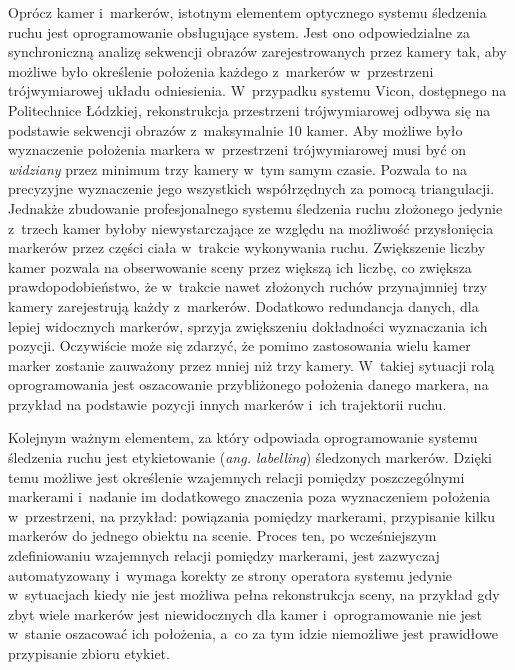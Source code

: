 Oprócz kamer i~markerów, istotnym elementem optycznego systemu śledzenia ruchu jest oprogramowanie obsługujące system. Jest ono odpowiedzialne za synchroniczną analizę sekwencji obrazów zarejestrowanych przez kamery tak, aby możliwe było określenie położenia każdego z~markerów w~przestrzeni trójwymiarowej układu odniesienia. W~przypadku systemu Vicon, dostępnego na Politechnice Łódzkiej, rekonstrukcja przestrzeni trójwymiarowej odbywa się na podstawie sekwencji obrazów z~maksymalnie 10 kamer. Aby możliwe było wyznaczenie położenia markera w~przestrzeni trójwymiarowej musi być on \textsl{widziany} przez minimum trzy kamery w~tym samym czasie. Pozwala to na precyzyjne wyznaczenie jego wszystkich współrzędnych za pomocą triangulacji. Jednakże zbudowanie profesjonalnego systemu śledzenia ruchu złożonego jedynie z~trzech kamer byłoby niewystarczające ze względu na możliwość przysłonięcia markerów przez części ciała w~trakcie wykonywania ruchu. Zwiększenie liczby kamer pozwala na obserwowanie sceny przez większą ich liczbę, co zwiększa prawdopodobieństwo, że w~trakcie nawet złożonych ruchów przynajmniej trzy kamery zarejestrują każdy z~markerów. Dodatkowo redundancja danych, dla lepiej widocznych markerów, sprzyja zwiększeniu dokładności wyznaczania ich pozycji. Oczywiście może się zdarzyć, że pomimo zastosowania wielu kamer marker zostanie zauważony przez mniej niż trzy kamery. W~takiej sytuacji rolą oprogramowania jest oszacowanie przybliżonego położenia danego markera, na przykład na podstawie pozycji innych markerów i~ich trajektorii ruchu.
			
Kolejnym ważnym elementem, za który odpowiada oprogramowanie systemu śledzenia ruchu jest etykietowanie (\emph{ang. labelling}) śledzonych markerów. Dzięki temu możliwe jest określenie wzajemnych relacji pomiędzy poszczególnymi markerami i~nadanie im dodatkowego znaczenia poza wyznaczeniem położenia w~przestrzeni, na przykład: powiązania pomiędzy markerami, przypisanie kilku markerów do jednego obiektu na scenie. Proces ten, po wcześniejszym zdefiniowaniu wzajemnych relacji pomiędzy markerami, jest zazwyczaj automatyzowany i~wymaga korekty ze strony operatora systemu jedynie w~sytuacjach kiedy nie jest możliwa pełna rekonstrukcja sceny, na przykład gdy zbyt wiele markerów jest niewidocznych dla kamer i~oprogramowanie nie jest w~stanie oszacować ich położenia, a~co za tym idzie niemożliwe jest prawidłowe przypisanie zbioru etykiet.

